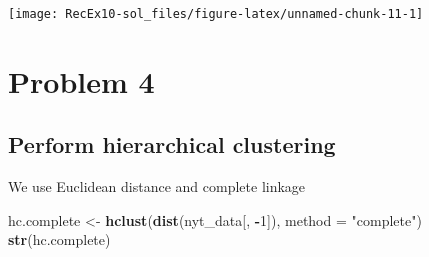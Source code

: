 \documentclass[
]{article}
\newenvironment{Shaded}{\begin{snugshade}}{\end{snugshade}}
\newcommand{\AttributeTok}[1]{\textcolor[rgb]{0.13,0.29,0.53}{#1}}
\newcommand{\DecValTok}[1]{\textcolor[rgb]{0.00,0.00,0.81}{#1}}
\newcommand{\FunctionTok}[1]{\textcolor[rgb]{0.13,0.29,0.53}{\textbf{#1}}}
\newcommand{\NormalTok}[1]{#1}
\newcommand{\OtherTok}[1]{\textcolor[rgb]{0.56,0.35,0.01}{#1}}
\newcommand{\SpecialCharTok}[1]{\textcolor[rgb]{0.81,0.36,0.00}{\textbf{#1}}}
\newcommand{\StringTok}[1]{\textcolor[rgb]{0.31,0.60,0.02}{#1}}
\begin{document}
\begin{Shaded}
\end{Shaded}

\begin{center}\texttt{[image: RecEx10-sol\_files/figure-latex/unnamed-chunk-11-1]} \end{center}

\section{Problem 4}\label{problem-4}

\subsection{Perform hierarchical
clustering}\label{perform-hierarchical-clustering}

We use Euclidean distance and complete linkage

\begin{Shaded}
\begin{Highlighting}[]
\NormalTok{hc.complete }\OtherTok{\textless{}{-}} \FunctionTok{hclust}\NormalTok{(}\FunctionTok{dist}\NormalTok{(nyt\_data[, }\SpecialCharTok{{-}}\DecValTok{1}\NormalTok{]), }\AttributeTok{method =} \StringTok{"complete"}\NormalTok{)}
\FunctionTok{str}\NormalTok{(hc.complete)}
\end{Highlighting}
\end{Shaded}
\end{document}
